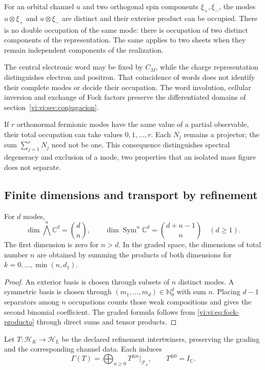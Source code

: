 For an orbital channel \(u\) and two orthogonal spin
components \(\xi_+,\xi_-\), the modes
\(u\otimes\xi_+\) and \(u\otimes\xi_-\) are distinct and their
exterior product can be occupied. There is no double occupation
of the same mode: there is occupation of two distinct components
of the representation. The same applies to two sheets when they
remain independent components of the realization.

The central electronic word may be fixed by \(C_M\), while
the charge representation distinguishes electron and positron. That
coincidence of words does not identify their complete modes or
decide their occupation. The word involution, cellular
inversion and exchange of Fock factors preserve the
differentiated domains of section~\ref{vi:vi:sec:conjugacion}.

If \(r\) orthonormal fermionic modes have the same value
of a partial observable, their total occupation can take values
\(0,1,\ldots,r\). Each \(N_j\) remains a projector;
the sum \(\sum_{j=1}^rN_j\) need not be one. This
consequence distinguishes spectral degeneracy and exclusion of
a mode, two properties that an isolated mass figure does not separate.

\subsection{Finite dimensions and transport by refinement}
\label{vi:vi:subsec:fock-refinamiento}

\begin{proposition}
\label{vi:vi:prop:censo-fock}
For \(d\) modes,
\[
 \dim\bigwedge^n\mathbb C^d=\binom dn,
 \qquad
 \dim\operatorname{Sym}^n\mathbb C^d=\binom{d+n-1}{n}
 \quad(d\ge1).
\]
The first dimension is zero for \(n>d\). In the graded
space, the dimensions of total number \(n\) are obtained
by summing the products of both dimensions for
\(k=0,\ldots,\min(n,d_1)\).
\end{proposition}
\begin{proof}
An exterior basis is chosen through subsets of \(n\) distinct
modes. A symmetric basis is chosen through
\((m_1,\ldots,m_d)\in\mathbb N_0^d\) with sum \(n\).
Placing \(d-1\) separators among \(n\) occupations
counts those weak compositions and gives the second binomial coefficient.
The graded formula follows from \eqref{vi:vi:eq:fock-producto} through
direct sums and tensor products.
\end{proof}

Let \(T:\mathcal H_K\to\mathcal H_L\) be the declared refinement
intertwiners, preserving the grading and the
corresponding channel data. Each induces
\begin{equation}
 \Gamma(T)=\bigoplus_{n\ge0}T^{\otimes n}|_{\mathcal F_n},
 \qquad T^{\otimes0}=I_{\mathbb C}.
 \label{vi:vi:eq:segunda-cuantizacion-transporte}
\end{equation}

